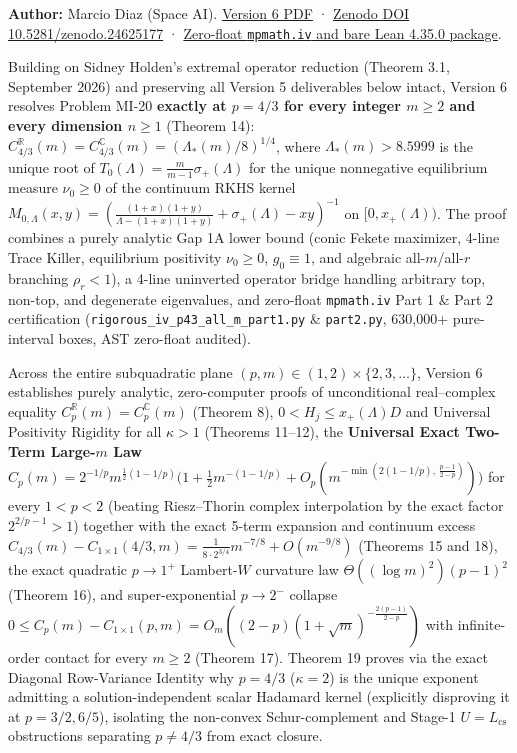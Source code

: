 \documentclass[11pt,a4paper]{article}
\begin{document}
\textbf{Author:} Marcio Diaz (Space AI).
\href{https://github.com/ajt60gaibb/OpenProblemsInNLA/blob/main/references/diaz-mi20-v6-exact-p43-2026-11-28/MI20_Exact_p43_Global_Asymptotics_Diaz_2026.pdf}{Version
6 PDF} · \href{https://doi.org/10.5281/zenodo.24625177}{Zenodo DOI
10.5281/zenodo.24625177} ·
\href{https://github.com/ajt60gaibb/OpenProblemsInNLA/blob/main/references/diaz-mi20-v6-exact-p43-2026-11-28/README.md}{Zero-float
\texttt{mpmath.iv} and bare Lean 4.35.0 package}.

Building on Sidney Holden's extremal operator reduction (Theorem 3.1,
September 2026) and preserving all Version 5 deliverables below intact,
Version 6 resolves Problem MI-20 \textbf{exactly at \(p = 4/3\) for
every integer \(m \ge 2\) and every dimension \(n \ge 1\)} (Theorem 14):
\(C_{4/3}^{\mathbb{R}}(m) = C_{4/3}^{\mathbb{C}}(m) = (\Lambda_*(m)/8)^{1/4}\),
where \(\Lambda_*(m) > 8.5999\) is the unique root of
\(T_0(\Lambda) = \frac{m}{m-1}\sigma_+(\Lambda)\) for the unique
nonnegative equilibrium measure \(\nu_0 \ge 0\) of the continuum RKHS
kernel
\(M_{0,\Lambda}(x,y) = (\frac{(1+x)(1+y)}{\Lambda-(1+x)(1+y)} + \sigma_+(\Lambda) - xy)^{-1}\)
on \([0, x_+(\Lambda))\). The proof combines a purely analytic Gap 1A
lower bound (conic Fekete maximizer, 4-line Trace Killer, equilibrium
positivity \(\nu_0 \ge 0\), \(g_0 \equiv 1\), and algebraic
all-\(m\)/all-\(r\) branching \(\rho_r < 1\)), a 4-line uninverted
operator bridge handling arbitrary top, non-top, and degenerate
eigenvalues, and zero-float \texttt{mpmath.iv} Part 1 \& Part 2
certification (\texttt{rigorous\_iv\_p43\_all\_m\_part1.py} \&
\texttt{part2.py}, 630,000+ pure-interval boxes, AST zero-float
audited).

Across the entire subquadratic plane
\((p, m) \in (1, 2) \times \{2, 3, \dots\}\), Version 6 establishes
purely analytic, zero-computer proofs of unconditional real--complex
equality \(C_p^{\mathbb{R}}(m) = C_p^{\mathbb{C}}(m)\) (Theorem 8),
\(0 < H_j \le x_+(\Lambda) D\) and Universal Positivity Rigidity for all
\(\kappa > 1\) (Theorems 11--12), the \textbf{Universal Exact Two-Term
Large-\(m\) Law}
\(C_p(m) = 2^{-1/p} m^{\frac{1}{2}(1-1/p)}\bigl(1 + \frac{1}{2} m^{-(1-1/p)} + O_p(m^{-\min(2(1-1/p),\,\frac{p-1}{2-p})})\bigr)\)
for every \(1 < p < 2\) (beating Riesz--Thorin complex interpolation by
the exact factor \(2^{2/p-1} > 1\)) together with the exact 5-term
expansion and continuum excess
\(C_{4/3}(m) - C_{1\times 1}(4/3, m) = \frac{1}{8\cdot 2^{3/4}} m^{-7/8} + O(m^{-9/8})\)
(Theorems 15 and 18), the exact quadratic \(p \to 1^+\) Lambert-\(W\)
curvature law \(\Theta((\log m)^2)(p-1)^2\) (Theorem 16), and
super-exponential \(p \to 2^-\) collapse
\(0 \le C_p(m) - C_{1\times 1}(p,m) = O_m((2-p)(1+\sqrt{m})^{-\frac{2(p-1)}{2-p}})\)
with infinite-order contact for every \(m \ge 2\) (Theorem 17). Theorem
19 proves via the exact Diagonal Row-Variance Identity why \(p = 4/3\)
(\(\kappa = 2\)) is the unique exponent admitting a solution-independent
scalar Hadamard kernel (explicitly disproving it at \(p = 3/2, 6/5\)),
isolating the non-convex Schur-complement and Stage-1
\(U = L_{\mathrm{cs}}\) obstructions separating \(p \neq 4/3\) from
exact closure.
\end{document}
